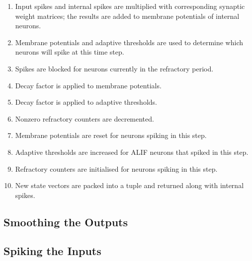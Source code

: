 \documentclass[../../report.tex]{subfiles}
\begin{document}
\begin{enumerate}

  \item Input spikes and internal spikes are multiplied with corresponding
  synaptic weight matrices; the results are added to membrane potentials of
  internal neurons.

  \item Membrane potentials and adaptive thresholds are used to determine which
  neurons will spike at this time step.

  \item Spikes are blocked for neurons currently in the refractory period.

  \item Decay factor is applied to membrane potentials.

  \item Decay factor is applied to adaptive thresholds.

  \item Nonzero refractory counters are decremented.

  \item Membrane potentials are reset for neurons spiking in this step.

  \item Adaptive thresholds are increased for ALIF neurons that spiked in this
  step.

  \item Refractory counters are initialised for neurons spiking in this step.

  \item New state vectors are packed into a tuple and returned along with
  internal spikes.

\end{enumerate}

\subsection{Smoothing the Outputs}

\subsection{Spiking the Inputs}
\end{document}
